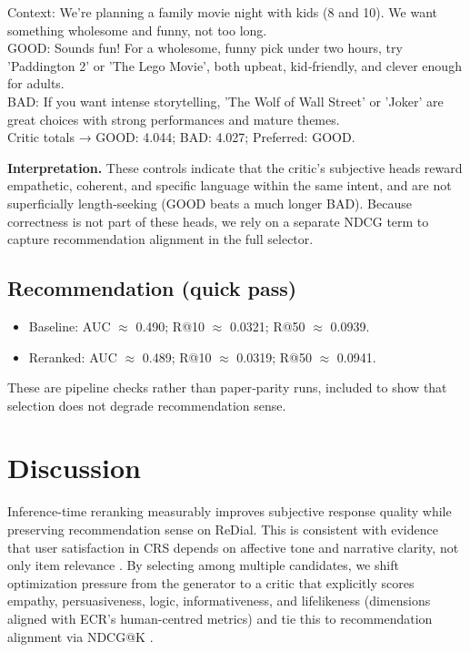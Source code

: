 \documentclass[12pt]{article}
\begin{document}
  \begin{center}
  \begin{qexample}
  Context: We're planning a family movie night with kids (8 and 10). We want something wholesome and funny, not too long.\\
  GOOD: Sounds fun! For a wholesome, funny pick under two hours, try 'Paddington 2' or 'The Lego Movie', both upbeat, kid‑friendly, and clever enough for adults.\\
  BAD: If you want intense storytelling, 'The Wolf of Wall Street' or 'Joker' are great choices with strong performances and mature themes.\\
  Critic totals → GOOD: 4.044; BAD: 4.027; Preferred: GOOD.
  \end{qexample}
  \end{center}

  \textbf{Interpretation.} These controls indicate that the critic's subjective heads reward empathetic, coherent, and specific language within the same intent, and are not superficially length‑seeking (GOOD beats a much longer BAD). Because correctness is not part of these heads, we rely on a separate NDCG term to capture recommendation alignment in the full selector.

  
  
  
  
  
  \subsection{Recommendation (quick pass)}
  \begin{itemize}[leftmargin=*]
    \item Baseline: AUC \(\approx\) 0.490; R@10 \(\approx\) 0.0321; R@50 \(\approx\) 0.0939.
    \item Reranked: AUC \(\approx\) 0.489; R@10 \(\approx\) 0.0319; R@50 \(\approx\) 0.0941.
  \end{itemize}
  These are pipeline checks rather than paper‑parity runs, included to show that selection does not degrade recommendation sense.
  
  
  
  \section{Discussion}
  Inference-time reranking measurably improves subjective response quality while preserving recommendation sense on ReDial. This is consistent with evidence that user satisfaction in CRS depends on affective tone and narrative clarity, not only item relevance \citep{zhang2024ecr}. By selecting among multiple candidates, we shift optimization pressure from the generator to a critic that explicitly scores empathy, persuasiveness, logic, informativeness, and lifelikeness (dimensions aligned with ECR's human-centred metrics) and tie this to recommendation alignment via NDCG@K \citep{evidently_ndcg}.
  
\end{document}
